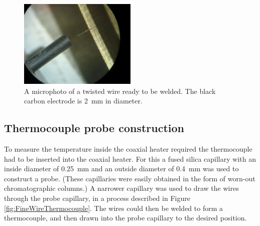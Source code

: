 \begin{figure}
	\centering
	\includegraphics[width=0.5\textwidth]{Figures/WelderMicro.jpg}
	\decoRule
	
\caption[A microphoto of a thermocouple twist ready to be welded.]{A microphoto
of a twisted wire ready to be welded. The black carbon electrode is
\SI{2}{\milli\metre} in diameter.}
	
	\label{fig:TCWeldMicro}
\end{figure}

\subsection{Thermocouple probe construction}

To measure the temperature inside the coaxial heater required the thermocouple
had to be inserted into the coaxial heater. For this a fused silica capillary
with an inside diameter of \SI{0.25}{\milli\metre} and an outside diameter of
\SI{0.4}{\milli\metre} was used to construct a probe. (These capillaries were
easily obtained in the form of worn-out chromatographic columns.) A narrower
capillary was used to draw the wires through the probe capillary, in a process
described in Figure \ref{fig:FineWireThermocouple}. The wires could then be
welded to form a thermocouple, and then drawn into the probe capillary to the
desired position.

